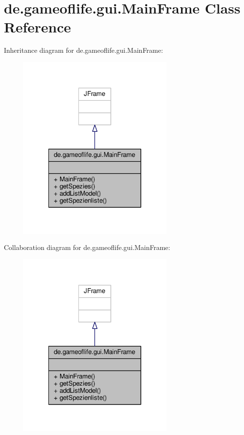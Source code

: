 \hypertarget{classde_1_1gameoflife_1_1gui_1_1MainFrame}{\section{de.\-gameoflife.\-gui.\-Main\-Frame Class Reference}
\label{classde_1_1gameoflife_1_1gui_1_1MainFrame}
}


Inheritance diagram for de.\-gameoflife.\-gui.\-Main\-Frame\-:\nopagebreak
\begin{figure}[H]
\begin{center}
\leavevmode
\includegraphics[width=222pt]{classde_1_1gameoflife_1_1gui_1_1MainFrame__inherit__graph}
\end{center}
\end{figure}


Collaboration diagram for de.\-gameoflife.\-gui.\-Main\-Frame\-:\nopagebreak
\begin{figure}[H]
\begin{center}
\leavevmode
\includegraphics[width=222pt]{classde_1_1gameoflife_1_1gui_1_1MainFrame__coll__graph}
\end{center}
\end{figure}
